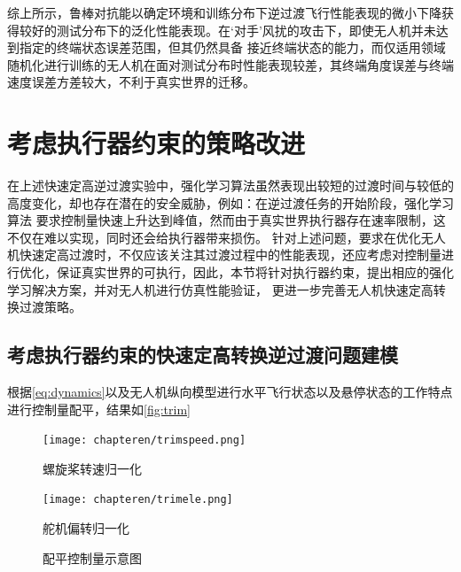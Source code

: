 综上所示，鲁棒对抗能以确定环境和训练分布下逆过渡飞行性能表现的微小下降获得较好的测试分布下的泛化性能表现。在‘对手’风扰的攻击下，即使无人机并未达到指定的终端状态误差范围，但其仍然具备
接近终端状态的能力，而仅适用领域随机化进行训练的无人机在面对测试分布时性能表现较差，其终端角度误差与终端速度误差方差较大，不利于真实世界的迁移。

\section{考虑执行器约束的策略改进}
在上述快速定高逆过渡实验中，强化学习算法虽然表现出较短的过渡时间与较低的高度变化，却也存在潜在的安全威胁，例如：在逆过渡任务的开始阶段，强化学习算法
要求控制量快速上升达到峰值，然而由于真实世界执行器存在速率限制，这不仅在难以实现，同时还会给执行器带来损伤。
针对上述问题，要求在优化无人机快速定高过渡时，不仅应该关注其过渡过程中的性能表现，还应考虑对控制量进行优化，保证真实世界的可执行，因此，本节将针对执行器约束，提出相应的强化学习解决方案，并对无人机进行仿真性能验证，
更进一步完善无人机快速定高转换过渡策略。
\subsection{考虑执行器约束的快速定高转换逆过渡问题建模}
根据\autoref{eq:dynamics}以及无人机纵向模型进行水平飞行状态以及悬停状态的工作特点进行控制量配平，结果如\autoref{fig:trim}
\begin{figure}[htbp]
    \centering
    \begin{minipage}{0.5\linewidth}
        \centering
        \texttt{[image: chapteren/trimspeed.png]} %
        \caption{螺旋桨转速归一化}
        \label{fig:reward_cmp3}
    \end{minipage}%
    \hfill %
    \begin{minipage}{0.5\linewidth}
        \centering
        \texttt{[image: chapteren/trimele.png]} %
        \caption{舵机偏转归一化}
        \label{fig:cost_cmp3}
    \end{minipage}
    \caption{配平控制量示意图}
    \label{fig:trim}
\end{figure}


